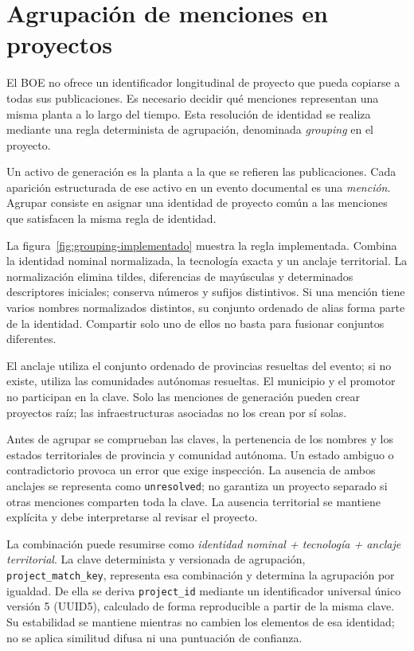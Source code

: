 \section{Agrupación de menciones en proyectos}
\label{sec:grouping}

El BOE no ofrece un identificador longitudinal de proyecto que pueda copiarse
a todas sus publicaciones. Es necesario decidir qué menciones representan
una misma planta a lo largo del tiempo. Esta resolución de identidad se
realiza mediante una regla determinista de agrupación, denominada
\emph{grouping} en el proyecto.

Un activo de generación es la planta a la que se refieren las publicaciones.
Cada aparición estructurada de ese activo en un evento documental es una
\emph{mención}. Agrupar consiste en asignar una identidad de proyecto común
a las menciones que satisfacen la misma regla de identidad.

La figura~\ref{fig:grouping-implementado} muestra la regla implementada.
Combina la identidad nominal normalizada, la tecnología exacta y un anclaje
territorial. La normalización elimina tildes, diferencias de mayúsculas y
determinados descriptores iniciales; conserva números y sufijos distintivos.
Si una mención tiene varios nombres normalizados distintos, su conjunto
ordenado de alias forma parte de la identidad. Compartir solo uno de ellos
no basta para fusionar conjuntos diferentes.

El anclaje utiliza el conjunto ordenado de provincias resueltas del evento;
si no existe, utiliza las comunidades autónomas resueltas. El municipio y el
promotor no participan en la clave. Solo las menciones de generación pueden
crear proyectos raíz; las infraestructuras asociadas no los crean por sí solas.

Antes de agrupar se comprueban las claves, la pertenencia de los nombres y
los estados territoriales de provincia y comunidad autónoma. Un estado
ambiguo o contradictorio provoca un error que exige inspección. La ausencia
de ambos anclajes se representa como \texttt{unresolved}; no garantiza un
proyecto separado si otras menciones comparten toda la clave. La ausencia
territorial se mantiene explícita y debe interpretarse al revisar el proyecto.

La combinación puede resumirse como \emph{identidad nominal + tecnología +
anclaje territorial}. La clave determinista y versionada de agrupación,
\texttt{project\_match\_key}, representa esa combinación y determina la agrupación
por igualdad. De ella se deriva \texttt{project\_id} mediante un identificador
universal único versión 5 (UUID5), calculado de forma reproducible a partir de
la misma clave.
Su estabilidad se mantiene mientras no cambien los elementos de esa identidad;
no se aplica similitud difusa ni una puntuación de confianza.

